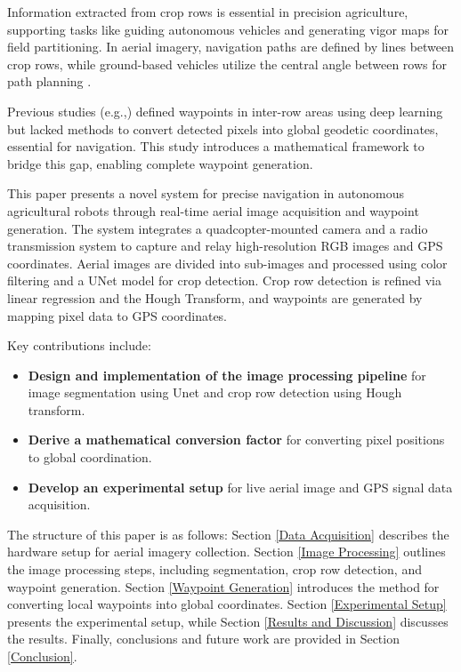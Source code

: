 \documentclass[conference]{IEEEtran}
\begin{document}
	Information extracted from crop rows is essential in precision agriculture, supporting tasks like guiding autonomous vehicles and generating vigor maps for field partitioning. In aerial imagery, navigation paths are defined by lines between crop rows, while ground-based vehicles utilize the central angle between rows for path planning \cite{b11,b1}.
	
	Previous studies (e.g.,\cite{b17}) defined waypoints in inter-row areas using deep learning but lacked methods to convert detected pixels into global geodetic coordinates, essential for navigation. This study introduces a mathematical framework to bridge this gap, enabling complete waypoint generation.
	
	
	This paper presents a novel system for precise navigation in autonomous agricultural robots through real-time aerial image acquisition and waypoint generation. The system integrates a quadcopter-mounted camera and a radio transmission system to capture and relay high-resolution RGB images and GPS coordinates. Aerial images are divided into sub-images and processed using color filtering and a UNet model for crop detection. Crop row detection is refined via linear regression and the Hough Transform, and waypoints are generated by mapping pixel data to GPS coordinates. 
	
	Key contributions include: 
	
	\begin{itemize}
		
		\item \textbf{Design and implementation of the image processing pipeline} for image segmentation using Unet and crop row detection using Hough transform.
		\item \textbf{Derive a mathematical conversion factor} for converting pixel positions to global coordination.
		\item \textbf{Develop an experimental setup} for live aerial image and GPS signal data acquisition.
	\end{itemize}


The structure of this paper is as follows: Section \ref{Data Acquisition} describes the hardware setup for aerial imagery collection. Section \ref{Image Processing} outlines the image processing steps, including segmentation, crop row detection, and waypoint generation. Section \ref{Waypoint Generation} introduces the method for converting local waypoints into global coordinates. Section \ref{Experimental Setup} presents the experimental setup, while Section \ref{Results and Discussion} discusses the results. Finally, conclusions and future work are provided in Section \ref{Conclusion}.
\end{document}
